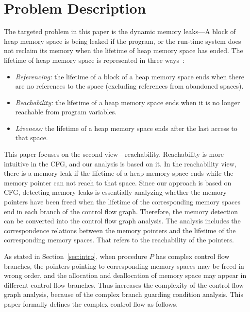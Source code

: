 \section{Problem Description}\label{sec:description}
The targeted problem in this paper is the dynamic memory leaks---A block of heap memory space is being leaked if the program, or the run-time system does not reclaim its memory when the lifetime of heap memory space has ended. 
The lifetime of heap memory space is represented in three ways~\cite{OR06}: 
\begin{itemize}
\item
\textit{Referencing:} the lifetime of a block of a heap memory space ends when there are no references to the space (excluding references from abandoned spaces).
\item 
\textit{Reachability:} the lifetime of a heap memory space ends when it is no longer reachable from program variables.
\item 
\textit{Liveness:} the lifetime of a heap memory space ends after the last access to that space.
\end{itemize}

This paper focuses on the second view---reachability. Reachability is more intuitive in the CFG, and our analysis is based on it.
In the reachability view, there is a memory leak if the lifetime of a heap memory space ends while the memory pointer can not reach to that space.
Since our approach is based on CFG, detecting memory leaks is essentially analyzing whether the memory pointers have been freed when the lifetime of the corresponding memory spaces end in each branch of the control flow graph. Therefore, the memory detection can be converted into the control flow graph analysis. The analysis includes the correspondence relations between the memory pointers and the lifetime of the corresponding memory spaces. That refers to the reachability of the pointers.

As stated in Section~\ref{sec:intro}, when procedure $P$ has complex control flow branches, the pointers pointing to corresponding memory spaces may be freed in wrong order, and the allocation and deallocation of memory space may appear in different control flow branches. Thus increases the complexity of the control flow graph analysis, because of the complex branch guarding condition analysis. %
This paper formally defines the complex control flow as follows.

